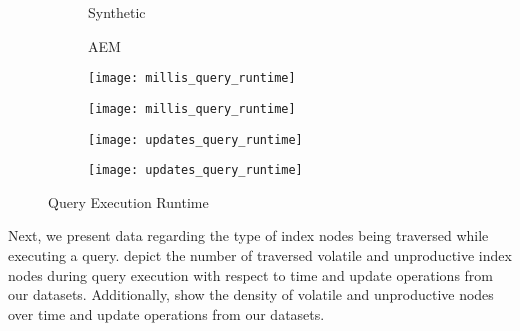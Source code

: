 \documentclass[abstracton,12pt]{scrartcl}
\theoremstyle{definition}
\begin{document}
\begin{figure}[h]
  \centering
  \begin{subfigure}{0.49\linewidth}
    \centering
    Synthetic
  \end{subfigure}
  \begin{subfigure}{0.49\linewidth}
    \centering
    AEM
  \end{subfigure}
  \begin{subfigure}{0.49\linewidth}
    \centering
    \texttt{[image: millis\_query\_runtime]}
    \caption{}
    \label{fig:query_runtime_synthetic_millis}
  \end{subfigure}
  \begin{subfigure}{0.49\linewidth}
    \centering
    \texttt{[image: millis\_query\_runtime]}
    \caption{}
    \label{fig:query_runtime_aem_millis}
  \end{subfigure}
  \begin{subfigure}{0.49\linewidth}
    \centering
    \texttt{[image: updates\_query\_runtime]}
    \caption{}
    \label{fig:query_runtime_synthetic_updates}
  \end{subfigure}
  \begin{subfigure}{0.49\linewidth}
    \centering
    \texttt{[image: updates\_query\_runtime]}
    \caption{}
    \label{fig:query_runtime_aem_updates}
  \end{subfigure}
  \caption{Query Execution Runtime}
  \label{fig:query_runtime}
\end{figure}

Next, we present data regarding the type of index nodes being traversed while
executing a query.
 depict
the number of traversed volatile and unproductive index nodes during query
execution with respect to time and update operations from our datasets.
Additionally,
show the density of volatile and unproductive nodes over time and update
operations from our datasets.
\end{document}
